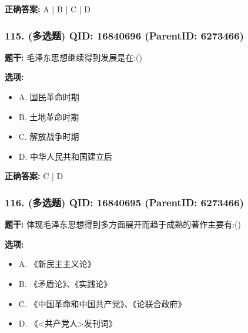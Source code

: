 \documentclass[12pt,UTF8]{ctexart}
\begin{document}
\textbf{正确答案:}
A | B | C | D

\vspace{0.3em}\hrulefill\vspace{0.7em}

\subsubsection*{115. (多选题) \small QID: 16840696 (ParentID: 6273466)}

\textbf{题干:}
毛泽东思想继续得到发展是在:()



\textbf{选项:}
\begin{itemize}[leftmargin=*]

  \item A. 国民革命时期

  \item B. 土地革命时期

  \item C. 解放战争时期

  \item D. 中华人民共和国建立后

\end{itemize}

\textbf{正确答案:}
C | D

\vspace{0.3em}\hrulefill\vspace{0.7em}

\subsubsection*{116. (多选题) \small QID: 16840695 (ParentID: 6273466)}

\textbf{题干:}
体现毛泽东思想得到多方面展开而趋于成熟的著作主要有:()



\textbf{选项:}
\begin{itemize}[leftmargin=*]

  \item A. 《新民主主义论》

  \item B. 《矛盾论》、《实践论》

  \item C. 《中国革命和中国共产党》、《论联合政府》

  \item D. 《<共产党人>发刊词》

\end{itemize}
\end{document}
